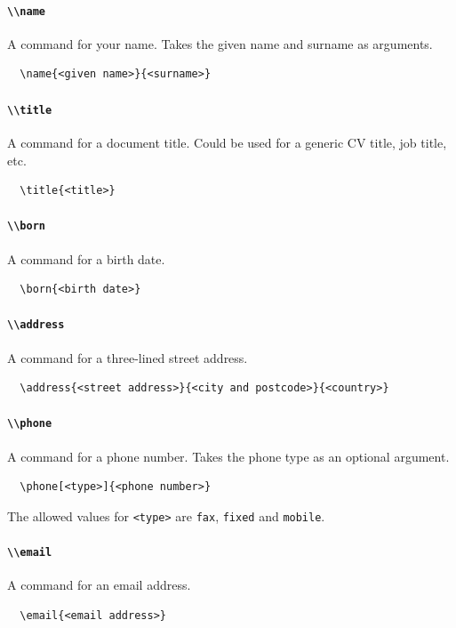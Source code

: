 \documentclass[a4paper, 11pt]{article}
\newcommand{\code}[1]{\lstinline!#1!}
\begin{document}
\paragraph{\code{\\name}}
A command for your name. Takes the given name and surname as arguments.
\begin{lstlisting}
  \name{<given name>}{<surname>}
\end{lstlisting}

\paragraph{\code{\\title}}
A command for a document title. Could be used for a generic CV title, job title, etc.
\begin{lstlisting}
  \title{<title>}
\end{lstlisting}

\paragraph{\code{\\born}}
A command for a birth date.
\begin{lstlisting}
  \born{<birth date>}
\end{lstlisting}

\paragraph{\code{\\address}}
A command for a three-lined street address.
\begin{lstlisting}
  \address{<street address>}{<city and postcode>}{<country>}
\end{lstlisting}

\paragraph{\code{\\phone}}
A command for a phone number. Takes the phone type as an optional argument.
\begin{lstlisting}
  \phone[<type>]{<phone number>}
\end{lstlisting}
The allowed values for \code{<type>} are \code{fax}, \code{fixed} and \code{mobile}.

\paragraph{\code{\\email}}
A command for an email address.
\begin{lstlisting}
  \email{<email address>}
\end{lstlisting}
\end{document}
